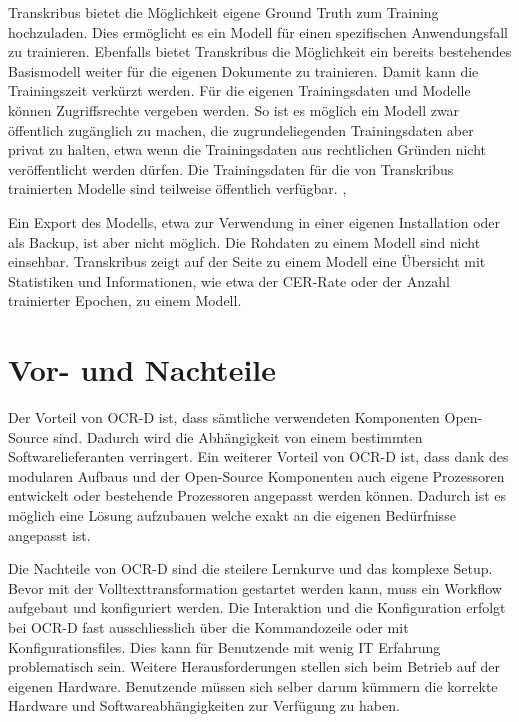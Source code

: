 \documentclass[a4paper,oneside, 12pt]{report}
\begin{document}
Transkribus bietet die Möglichkeit eigene Ground Truth zum Training hochzuladen. Dies ermöglicht es ein Modell für einen spezifischen Anwendungsfall zu trainieren. Ebenfalls bietet Transkribus die Möglichkeit ein bereits bestehendes Basismodell weiter für die eigenen Dokumente zu trainieren. Damit kann die Trainingszeit verkürzt werden. Für die eigenen Trainingsdaten und Modelle können Zugriffsrechte vergeben werden. So ist es möglich ein Modell zwar öffentlich zugänglich zu machen, die zugrundeliegenden Trainingsdaten aber privat zu halten, etwa wenn die Trainingsdaten aus rechtlichen Gründen nicht veröffentlicht werden dürfen. Die Trainingsdaten für die von Transkribus trainierten Modelle sind teilweise öffentlich verfügbar. \cite{diem_markus_2017_1491441}, \cite{transkribusmodels}

Ein Export des Modells, etwa zur Verwendung in einer eigenen Installation oder als Backup, ist aber nicht möglich. Die Rohdaten zu einem Modell sind nicht einsehbar. Transkribus zeigt auf der Seite zu einem Modell eine Übersicht mit Statistiken und Informationen, wie etwa der CER-Rate oder der Anzahl trainierter Epochen, zu einem Modell. \cite{transkribusmodels}


\section{Vor- und Nachteile}
Der Vorteil von OCR-D ist, dass sämtliche verwendeten Komponenten Open-Source sind. Dadurch wird die Abhängigkeit von einem bestimmten Softwarelieferanten verringert. Ein weiterer Vorteil von OCR-D ist, dass dank des modularen Aufbaus und der Open-Source Komponenten auch eigene Prozessoren entwickelt oder bestehende Prozessoren angepasst werden können. Dadurch ist es möglich eine Lösung aufzubauen welche exakt an die eigenen Bedürfnisse angepasst ist.

Die Nachteile von OCR-D sind die steilere Lernkurve und das komplexe Setup. Bevor mit der Volltexttransformation gestartet werden kann, muss ein Workflow aufgebaut und konfiguriert werden. Die Interaktion und die Konfiguration erfolgt bei OCR-D fast ausschliesslich über die Kommandozeile oder mit Konfigurationsfiles. Dies kann für Benutzende mit wenig IT Erfahrung problematisch sein. Weitere Herausforderungen stellen sich beim Betrieb auf der eigenen Hardware. Benutzende müssen sich selber darum kümmern die korrekte Hardware und Softwareabhängigkeiten zur Verfügung zu haben.
\end{document}
